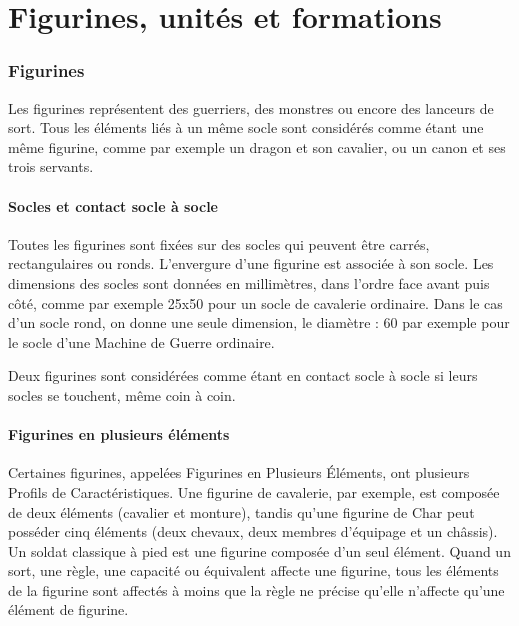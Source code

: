 
\part{Figurines, unités et formations}

\section{Figurines}

Les figurines représentent des guerriers, des monstres ou encore des lanceurs de sort. Tous les éléments liés à un même socle sont considérés comme étant une même figurine, comme par exemple un dragon et son cavalier, ou un canon et ses trois servants.

\subsection{Socles et contact socle à socle}

Toutes les figurines sont fixées sur des socles qui peuvent être carrés, rectangulaires ou ronds. L'envergure d'une figurine est associée à son socle. Les dimensions des socles sont données en millimètres, dans l'ordre face avant puis côté, comme par exemple \unit{25x50}{\milli\meter} pour un socle de cavalerie ordinaire. Dans le cas d'un socle rond, on donne une seule dimension, le diamètre : \unit{60}{\milli\meter} par exemple pour le socle d'une Machine de Guerre ordinaire.

Deux figurines sont considérées comme étant en contact socle à socle si leurs socles se touchent, même coin à coin.

\subsection{Figurines en plusieurs éléments}

Certaines figurines, appelées Figurines en Plusieurs Éléments, ont plusieurs Profils de Caractéristiques. Une figurine de cavalerie, par exemple, est composée de deux éléments (cavalier et monture), tandis qu'une figurine de Char peut posséder cinq éléments (deux chevaux, deux membres d'équipage et un châssis). Un soldat classique à pied est une figurine composée d'un seul élément.  Quand un sort, une règle, une capacité ou équivalent affecte une figurine, tous les éléments de la figurine sont affectés à moins que la règle ne précise qu'elle n'affecte qu'une élément de figurine.

